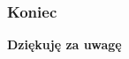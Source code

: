 \documentclass{beamer}
\begin{document}
\section{}
\begin{frame}\frametitle{Koniec}
	\centering
	\LARGE{\textbf{Dziękuję za uwagę}}
\end{frame}
\end{document}
